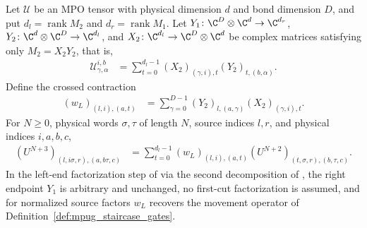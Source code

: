 \begin{lemma}
    \label{thm:mpug_truncated_symmetry_left_growth}
    \leanok
    Let $\mathcal U$ be an MPO tensor with physical dimension $d$ and bond
    dimension $D$, and put $d_l=\operatorname{rank}M_2$ and
    $d_r=\operatorname{rank}M_1$. Let
    $Y_1\colon\C^D\otimes\C^d\to\C^{d_r}$,
    $Y_2\colon\C^d\otimes\C^D\to\C^{d_l}$, and
    $X_2\colon\C^{d_l}\to\C^D\otimes\C^d$ be complex matrices
    satisfying only $M_2=X_2Y_2$, that is,
    \begin{align}
        \mathcal U^{i,b}_{\gamma,\alpha}
         & =\sum_{t=0}^{d_l-1}(X_2)_{(\gamma,i),t}(Y_2)_{t,(b,\alpha)}.
    \end{align}
    Define the crossed contraction
    \begin{align}
        (w_L)_{(l,i),(a,t)}
         & =\sum_{\gamma=0}^{D-1}(Y_2)_{l,(a,\gamma)}(X_2)_{(\gamma,i),t}.
    \end{align}
    For $N\geq0$, physical words $\sigma,\tau$ of length $N$,
    source indices $l,r$, and physical indices $i,a,b,c$,
    \begin{align}
        (U^{N+3})_{(l,i\sigma,r),(a,b\tau,c)}
         & =\sum_{t=0}^{d_l-1}(w_L)_{(l,i),(a,t)}
        (U^{N+2})_{(t,\sigma,r),(b,\tau,c)}.
        \label{eq:mpug_truncated_symmetry_left_growth}
    \end{align}
    In the left-end factorization step of
    \cite[lines~2101--2174]{FrancoRubio2025MPUGauging} via the second
    decomposition of \cite[lines~479--530]{Cirac2017MPU}, the right
    endpoint $Y_1$ is arbitrary and unchanged, no first-cut factorization
    is assumed, and for normalized source factors $w_L$ recovers the
    movement operator of Definition~\ref{def:mpug_staircase_gates}.
\end{lemma}
